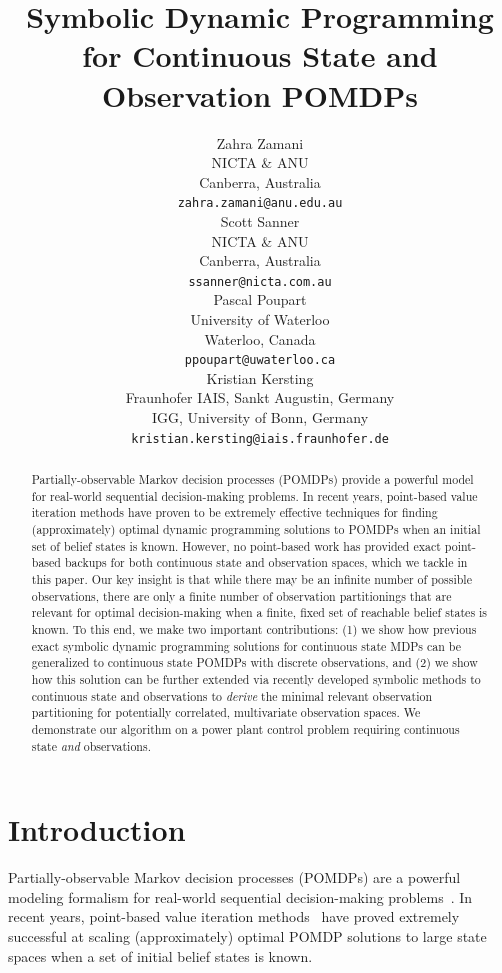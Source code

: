 \documentclass{article} %
\title{Symbolic Dynamic Programming for Continuous State and Observation POMDPs}
\author
{
Zahra Zamani \\
NICTA & ANU\\
Canberra, Australia \\
\texttt{zahra.zamani@anu.edu.au} \\
\And
Scott Sanner \\
NICTA & ANU\\
Canberra, Australia \\
\texttt{ssanner@nicta.com.au} \\
\And
Pascal Poupart \\
University of Waterloo \\
Waterloo, Canada \\
\texttt{ppoupart@uwaterloo.ca} \\
\And
Kristian Kersting \\
Fraunhofer IAIS, Sankt Augustin, Germany \\
IGG, University of Bonn, Germany \\
\texttt{kristian.kersting@iais.fraunhofer.de} \\
}
\begin{document}
\maketitle

\begin{abstract}
Partially-observable Markov decision processes (POMDPs) provide a
powerful model for real-world sequential decision-making problems.  In
recent years, point-based value iteration methods have proven to be
extremely effective techniques for finding (approximately) optimal
dynamic programming solutions to POMDPs when an initial set of belief
states is known.  However, no point-based work has provided exact
point-based backups for both continuous state and observation spaces,
which we tackle in this paper.  Our key insight is that while there
may be an infinite number of possible observations, there are only a
finite number of observation partitionings that are relevant for
optimal decision-making when a finite, fixed set of reachable belief
states is known.  To this end, we make two important contributions:
(1) we show how previous exact symbolic dynamic programming solutions
for continuous state MDPs can be generalized to continuous state
POMDPs with discrete observations, and (2) we show how this solution
can be further extended via recently developed symbolic methods to
continuous state and observations to \emph{derive} the minimal
relevant observation partitioning for potentially correlated,
multivariate observation spaces.
We demonstrate our algorithm on a power plant
control problem requiring continuous state 
\emph{and} observations.
\end{abstract}

\section{Introduction} %

Partially-observable Markov decision processes (POMDPs) are a powerful
modeling formalism for real-world sequential decision-making
problems~\cite{kaebling}.  In recent years, point-based value
iteration methods~\cite{pbvi_jair06,hsvi2,Perseus,gapmin} have proved
extremely successful at scaling (approximately) optimal POMDP
solutions to large state spaces when a set of initial belief states is
known.
\end{document}
